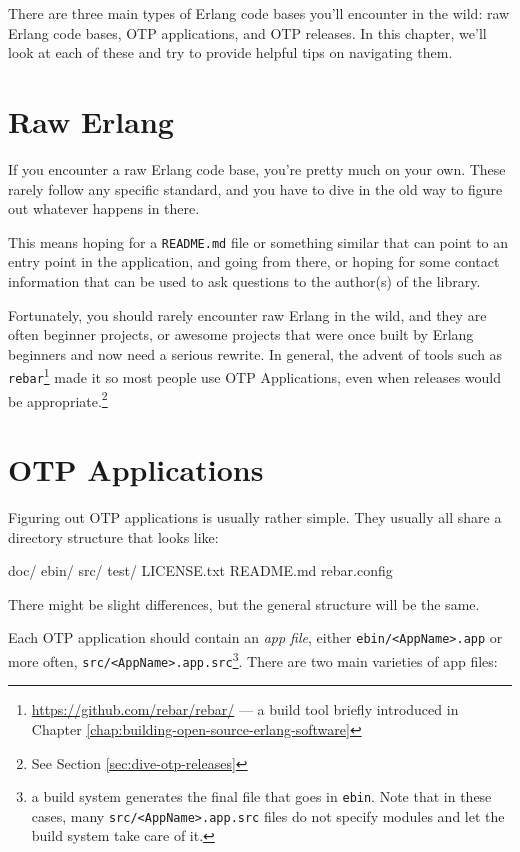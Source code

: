 \documentclass[11pt, oneside]{book}   	%
\newcommand{\filename}[1]{\Verb`#1`}
\newcommand{\app}[1]{\Verb`#1`}
\begin{document}
There are three main types of Erlang code bases you'll encounter in the wild: raw Erlang code bases, OTP applications, and OTP releases. In this chapter, we'll look at each of these and try to provide helpful tips on navigating them.

\section{Raw Erlang}
\label{sec:dive-raw-erlang}

If you encounter a raw Erlang code base, you're pretty much on your own. These rarely follow any specific standard, and you have to dive in the old way to figure out whatever happens in there.

This means hoping for a \filename{README.md} file or something similar that can point to an entry point in the application, and going from there, or hoping for some contact information that can be used to ask questions to the author(s) of the library.

Fortunately, you should rarely encounter raw Erlang in the wild, and they are often beginner projects, or awesome projects that were once built by Erlang beginners and now need a serious rewrite. In general, the advent of tools such as \app{rebar}\footnote{\href{https://github.com/rebar/rebar/}{https://github.com/rebar/rebar/} — a build tool briefly introduced in Chapter \ref{chap:building-open-source-erlang-software}} made it so most people use OTP Applications, even when releases would be appropriate.\footnote{See Section \ref{sec:dive-otp-releases}}

\section{OTP Applications}
\label{sec:dive-otp-applications}

Figuring out OTP applications is usually rather simple. They usually all share a directory structure that looks like:

\begin{VerbatimText}
doc/
ebin/
src/
test/
LICENSE.txt
README.md
rebar.config
\end{VerbatimText}

There might be slight differences, but the general structure will be the same.

Each OTP application should contain an \emph{app file}, either \filename{ebin/<AppName>.app} or more often, \filename{src/<AppName>.app.src}\footnote{a build system generates the final file that goes in \filename{ebin}. Note that in these cases, many  \filename{src/<AppName>.app.src} files do not specify modules and let the build system take care of it.}. There are two main varieties of app files:
\end{document}
